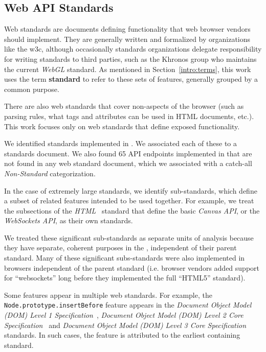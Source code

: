 \subsection{Web API Standards}
\label{measurement:data-sources:method-web-standards}
Web standards are documents defining functionality that web browser vendors
should implement.  They are generally written and formalized by organizations
like the \gls{w3c}, although occasionally standards organizations delegate
responsibility for writing standards to third parties, such as the Khronos
group who maintains the current \textit{WebGL} standard.  As mentioned in
Section~\ref{intro:terms}, this work uses the term \textbf{standard} to refer
to these sets of features, generally grouped by a common purpose.

There are also web standards that cover non-\JS aspects of the browser (such
as parsing rules, what tags and attributes can be used in HTML documents,
etc.). This work focuses only on web standards that define \JS exposed
functionality.

We identified \numstandards standards implemented in \FF.  We associated each
of these to a standards document.  We also found 65 API endpoints implemented
in \FF that are not found in any web standard document, which we associated
with a catch-all \textit{Non-Standard} categorization.

In the case of extremely large standards, we identify sub-standards, which
define a subset of related features intended to be used together.  For example,
we treat the subsections of the \textit{HTML}~\cite{whatwg2018html} standard
that define the basic \textit{Canvas API}, or the \textit{WebSockets API}, as
their own standards.

We treated these significant sub-standards as separate units of analysis
because they have separate, coherent purposes in the \WAPI, independent
of their parent standard. Many of these significant subs-standards
were also implemented in browsers independent of the parent standard (i.e. browser
vendors added support for ``websockets'' long before they implemented the full
``HTML5'' standard).

Some features appear in multiple web standards.  For example, the
\texttt{Node.prototype.insertBefore} feature appears in the \textit{Document
Object Model (DOM) Level 1 Specification}~\cite{dom1w3c}, \textit{Document
Object Model (DOM) Level 2 Core Specification}~\cite{dom2corew3c} and
\textit{Document Object Model (DOM) Level 3 Core
Specification}~\cite{dom3corew3c} standards.  In such cases, the feature is
attributed to the earliest containing standard.


